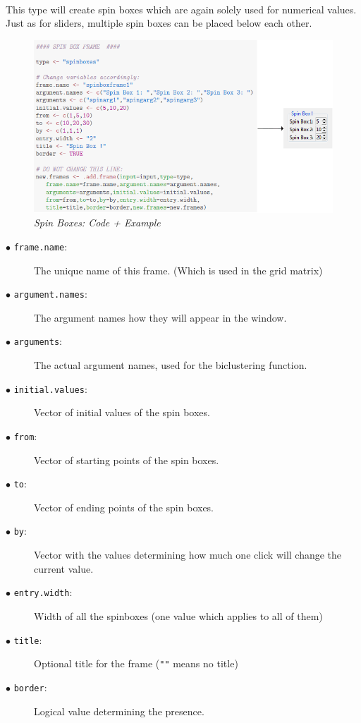 \documentclass[a4paper]{article}\usepackage[]{graphicx}\usepackage[]{color}
\begin{document}
\\
This type will create spin boxes which are again solely used for numerical
values. Just as for sliders, multiple spin boxes can be placed below each other.

\begin{figure}[H]
\centering
\includegraphics[scale=0.5]{figures/spinboxes.png}
\caption{{\it Spin Boxes: Code + Example}
\label{spinboxes}}
\end{figure}

\begin{description}
  \item[$\bullet$ \texttt{frame.name}:] The unique name of this frame. (Which is used in the grid matrix)
  \item[$\bullet$ \texttt{argument.names}:] The argument names how they will
  appear in the window.  
  \item[$\bullet$ \texttt{arguments}:] The actual argument names, used for the
  biclustering function.  
  \item[$\bullet$ \texttt{initial.values}:] Vector of initial values of the
  spin boxes.
  \item[$\bullet$ \texttt{from}:] Vector of starting points of the spin boxes.
  \item[$\bullet$ \texttt{to}:] Vector of ending points of the spin boxes.
  \item[$\bullet$ \texttt{by}:] Vector with the values determining how much one
  click will change the current value.
  \item[$\bullet$ \texttt{entry.width}:] Width of all the spinboxes (one value
  which applies to all of them)
  \item[$\bullet$ \texttt{title}:] Optional title for the frame (\verb|""| means no title)
  \item[$\bullet$ \texttt{border}:] Logical value determining the presence.   
  
\end{description}
\end{document}

